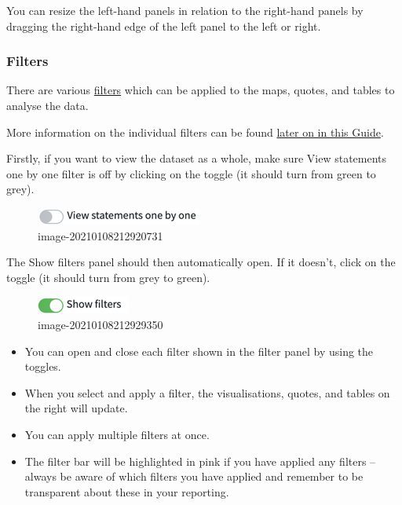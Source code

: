 \documentclass[
]{book}
\begin{document}
You can resize the left-hand panels in relation to the right-hand panels by dragging the right-hand edge of the left panel to the left or right.

\hypertarget{filters-1}{%
\subsubsection{Filters}\label{filters-1}}

There are various \protect\hyperlink{analysis}{filters} which can be applied to the maps, quotes, and tables to analyse the data.

More information on the individual filters can be found \protect\hyperlink{analysis}{later on in this Guide}.

Firstly, if you want to view the dataset as a whole, make sure View statements one by one filter is off by clicking on the toggle (it should turn from green to grey).

\begin{figure}
\centering
\includegraphics{_assets/image-20210108212920731.png}
\caption{image-20210108212920731}
\end{figure}

The Show filters panel should then automatically open. If it doesn't, click on the toggle (it should turn from grey to green).

\begin{figure}
\centering
\includegraphics{_assets/image-20210108212929350.png}
\caption{image-20210108212929350}
\end{figure}

\begin{itemize}
\item
  You can open and close each filter shown in the filter panel by using the toggles.
\item
  When you select and apply a filter, the visualisations, quotes, and tables on the right will update.
\item
  You can apply multiple filters at once.
\item
  The filter bar will be highlighted in pink if you have applied any filters -- always be aware of which filters you have applied and remember to be transparent about these in your reporting.
\end{itemize}
\end{document}
